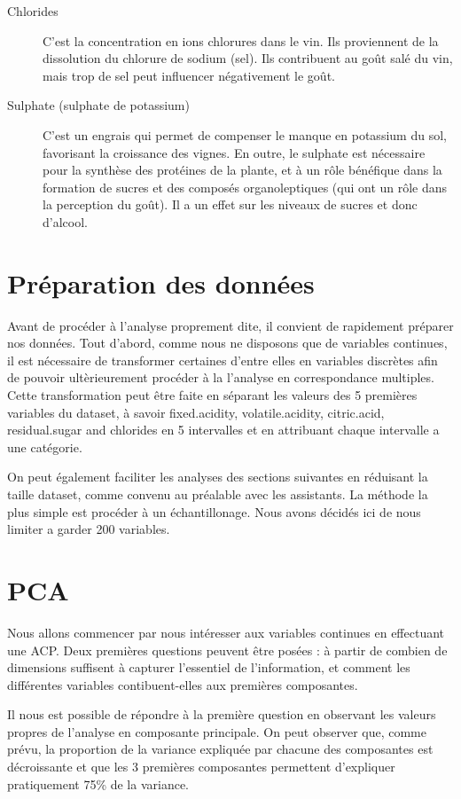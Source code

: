\documentclass[11pt,a4paper]{article}
\begin{document}
\begin{description}
	\item[Chlorides] C'est la concentration en ions chlorures dans le vin. Ils proviennent de la dissolution du chlorure de sodium (sel). Ils contribuent au goût salé du vin, mais trop de sel peut influencer négativement le goût.
	\item[Sulphate (sulphate de potassium)] C'est un engrais qui permet de compenser le manque en potassium du sol, favorisant la croissance des vignes. En outre, le sulphate est nécessaire pour la synthèse des protéines de la plante, et à un rôle bénéfique dans la formation de sucres et des composés organoleptiques (qui ont un rôle dans la perception du goût). Il a un effet sur les niveaux de sucres et donc d'alcool.
\end{description}

\section{Préparation des données}

Avant de procéder à l'analyse proprement dite, il convient de rapidement préparer nos données. Tout d'abord, comme nous ne disposons que de variables continues, il est nécessaire de transformer certaines d'entre elles en variables discrètes afin de pouvoir ultèrieurement procéder à la l'analyse en correspondance multiples. Cette transformation peut être faite en séparant les valeurs des 5 premières variables du dataset, à savoir fixed.acidity, volatile.acidity, citric.acid, residual.sugar and chlorides en 5 intervalles et en attribuant chaque intervalle a une catégorie. 

On peut également faciliter les analyses des sections suivantes en réduisant la taille dataset, comme convenu au préalable avec les assistants. La méthode la plus simple est procéder à un échantillonage. Nous avons décidés ici de nous limiter a garder 200 variables.

\section{PCA}

Nous allons commencer par nous intéresser aux variables continues en effectuant une ACP. Deux premières questions peuvent être posées : à partir de combien de dimensions suffisent à capturer l'essentiel de l'information, et comment les différentes variables contibuent-elles aux premières composantes.

Il nous est possible de répondre à la première question en observant les valeurs propres de l'analyse en composante principale. On peut observer que, comme prévu, la proportion de la variance expliquée par chacune des composantes est décroissante et que les 3 premières composantes permettent d'expliquer pratiquement 75\% de la variance.
\end{document}
